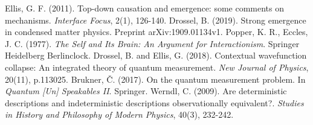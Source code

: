 \documentclass[aps,prl,twocolumn,showpacs,superscriptaddress,groupedaddress, nofootinbib]{revtex4-1}
\begin{document}
\begin{small}
\begin{thebibliography}{200}
 Ellis, G. F. (2011). Top-down causation and emergence: some comments on mechanisms. \emph{Interface Focus}, 2(1), 126-140.
 Drossel, B. (2019). Strong emergence in condensed matter physics. Preprint arXiv:1909.01134v1.
 Popper, K. R., Eccles, J. C. (1977). \emph{The Self and Its Brain: An Argument for Interactionism}. Springer Heidelberg Berlinclock.
 Drossel, B. and Ellis, G. (2018). Contextual wavefunction collapse: An integrated theory of quantum measurement. \emph{New Journal of Physics}, 20(11), p.113025.
 Brukner, \v{C}. (2017). On the quantum measurement problem. In \emph{Quantum [Un] Speakables II}. Springer.
 Werndl, C. (2009). Are deterministic descriptions and indeterministic descriptions observationally equivalent?. \emph{Studies in History and Philosophy of Modern Physics}, 40(3), 232-242.

\end{thebibliography}
\end{small}
\end{document}
